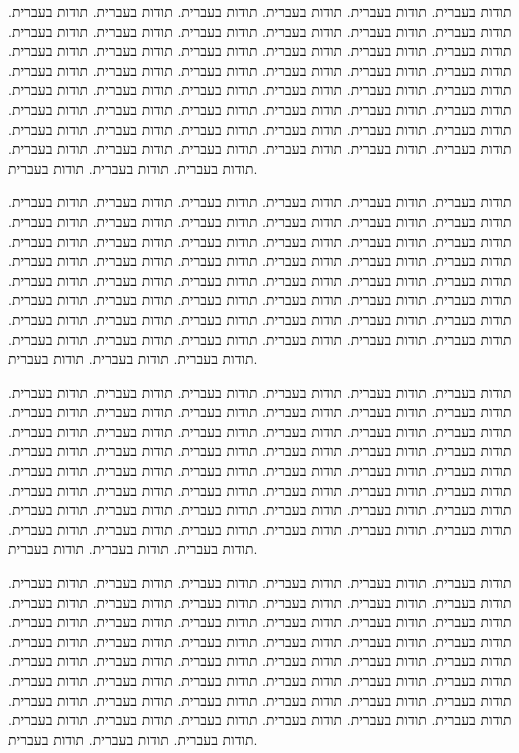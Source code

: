 תודות בעברית.  תודות בעברית.  תודות בעברית.  תודות בעברית.  תודות בעברית.  תודות בעברית.  תודות בעברית.  תודות בעברית.  תודות בעברית.  תודות בעברית.  תודות בעברית.  תודות בעברית.  תודות בעברית.  תודות בעברית.  תודות בעברית.  תודות בעברית.  תודות בעברית.  תודות בעברית.  תודות בעברית.  תודות בעברית.  תודות בעברית.  תודות בעברית.  תודות בעברית.  תודות בעברית.  תודות בעברית.  תודות בעברית.  תודות בעברית.  תודות בעברית.  תודות בעברית.  תודות בעברית.  תודות בעברית.  תודות בעברית.  תודות בעברית.  תודות בעברית.  תודות בעברית.  תודות בעברית.  תודות בעברית.  תודות בעברית.  תודות בעברית.  תודות בעברית.  תודות בעברית.  תודות בעברית.  תודות בעברית.  תודות בעברית.  תודות בעברית.  תודות בעברית.  תודות בעברית.  תודות בעברית.  תודות בעברית.  תודות בעברית.  תודות בעברית.



תודות בעברית.  תודות בעברית.  תודות בעברית.  תודות בעברית.  תודות בעברית.  תודות בעברית.  תודות בעברית.  תודות בעברית.  תודות בעברית.  תודות בעברית.  תודות בעברית.  תודות בעברית.  תודות בעברית.  תודות בעברית.  תודות בעברית.  תודות בעברית.  תודות בעברית.  תודות בעברית.  תודות בעברית.  תודות בעברית.  תודות בעברית.  תודות בעברית.  תודות בעברית.  תודות בעברית.  תודות בעברית.  תודות בעברית.  תודות בעברית.  תודות בעברית.  תודות בעברית.  תודות בעברית.  תודות בעברית.  תודות בעברית.  תודות בעברית.  תודות בעברית.  תודות בעברית.  תודות בעברית.  תודות בעברית.  תודות בעברית.  תודות בעברית.  תודות בעברית.  תודות בעברית.  תודות בעברית.  תודות בעברית.  תודות בעברית.  תודות בעברית.  תודות בעברית.  תודות בעברית.  תודות בעברית.  תודות בעברית.  תודות בעברית.  תודות בעברית.


תודות בעברית.  תודות בעברית.  תודות בעברית.  תודות בעברית.  תודות בעברית.  תודות בעברית.  תודות בעברית.  תודות בעברית.  תודות בעברית.  תודות בעברית.  תודות בעברית.  תודות בעברית.  תודות בעברית.  תודות בעברית.  תודות בעברית.  תודות בעברית.  תודות בעברית.  תודות בעברית.  תודות בעברית.  תודות בעברית.  תודות בעברית.  תודות בעברית.  תודות בעברית.  תודות בעברית.  תודות בעברית.  תודות בעברית.  תודות בעברית.  תודות בעברית.  תודות בעברית.  תודות בעברית.  תודות בעברית.  תודות בעברית.  תודות בעברית.  תודות בעברית.  תודות בעברית.  תודות בעברית.  תודות בעברית.  תודות בעברית.  תודות בעברית.  תודות בעברית.  תודות בעברית.  תודות בעברית.  תודות בעברית.  תודות בעברית.  תודות בעברית.  תודות בעברית.  תודות בעברית.  תודות בעברית.  תודות בעברית.  תודות בעברית.  תודות בעברית.



תודות בעברית.  תודות בעברית.  תודות בעברית.  תודות בעברית.  תודות בעברית.  תודות בעברית.  תודות בעברית.  תודות בעברית.  תודות בעברית.  תודות בעברית.  תודות בעברית.  תודות בעברית.  תודות בעברית.  תודות בעברית.  תודות בעברית.  תודות בעברית.  תודות בעברית.  תודות בעברית.  תודות בעברית.  תודות בעברית.  תודות בעברית.  תודות בעברית.  תודות בעברית.  תודות בעברית.  תודות בעברית.  תודות בעברית.  תודות בעברית.  תודות בעברית.  תודות בעברית.  תודות בעברית.  תודות בעברית.  תודות בעברית.  תודות בעברית.  תודות בעברית.  תודות בעברית.  תודות בעברית.  תודות בעברית.  תודות בעברית.  תודות בעברית.  תודות בעברית.  תודות בעברית.  תודות בעברית.  תודות בעברית.  תודות בעברית.  תודות בעברית.  תודות בעברית.  תודות בעברית.  תודות בעברית.  תודות בעברית.  תודות בעברית.  תודות בעברית.
